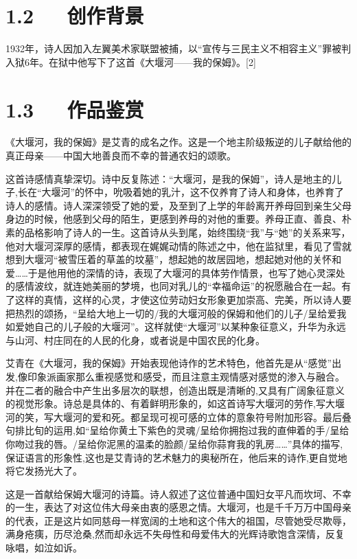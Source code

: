 \documentclass[letterpaper,10pt,english]{sphinxmanual}
\begin{document}
\section{1.2   创作背景}
\label{\detokenize{p01_u6563_u6587/_u827e_u9752-_u5927_u5830_u6cb3_u2014_u2014_u6211_u7684_u4fdd_u59c6:id4}}
1932年，诗人因加入左翼美术家联盟被捕，以“宣传与三民主义不相容主义”罪被判入狱6年。在狱中他写下了这首《大堰河——我的保姆》。{[}2{]}


\section{1.3   作品鉴赏}
\label{\detokenize{p01_u6563_u6587/_u827e_u9752-_u5927_u5830_u6cb3_u2014_u2014_u6211_u7684_u4fdd_u59c6:id5}}
《大堰河，我的保姆》是艾青的成名之作。这是一个地主阶级叛逆的儿子献给他的真正母亲——中国大地善良而不幸的普通农妇的颂歌。

这首诗感情真挚深切。诗中反复陈述：“大堰河，是我的保姆”，诗人是地主的儿子,长在“大堰河”的怀中，吮吸着她的乳汁，这不仅养育了诗人和身体，也养育了诗人的感情。诗人深深领受了她的爱，及至到了上学的年龄离开养母回到亲生父母身边的时候，他感到父母的陌生，更感到养母的对他的重要。养母正直、善良、朴素的品格影响了诗人的一生。这首诗从头到尾，始终围绕“我”与“她”的关系来写，他对大堰河深厚的感情，都表现在娓娓动情的陈述之中，他在监狱里，看见了雪就想到大堰河“被雪压着的草盖的坟墓”，想起她的故居园地，想起她对他的关怀和爱……于是他用他的深情的诗，表现了大堰河的具体劳作情景，也写了她心灵深处的感情波纹，就连她美丽的梦境，也同对乳儿的“幸福命运”的祝愿融合在一起。有了这样的真情，这样的心灵，才使这位劳动妇女形象更加崇高、完美，所以诗人要把热烈的颂扬，“呈给大地上一切的/我的大堰河般的保姆和他们的儿子/呈给爱我如爱她自己的儿子般的大堰河”。这样就使“大堰河”以某种象征意义，升华为永远与山河、村庄同在的人民的化身，或者说是中国农民的化身。

艾青在《大堰河，我的保姆》开始表现他诗作的艺术特色，他首先是从“感觉”出发,像印象派画家那么重视感觉和感受，而且注意主观情感对感觉的渗入与融合。并在二者的融合中产生出多层次的联想，创造出既是清晰的,又具有广阔象征意义的视觉形象。诗总是具体的、有着鲜明形象的，如这首诗写大堰河的劳作,写大堰河的笑，写大堰河的爱和死。都呈现可视可感的立体的意象符号附加形容。最后叠句排比旬的运用,如“呈给你黄土下紫色的灵魂/呈给你拥抱过我的直伸着的手/呈给你吻过我的唇。/呈给你泥黑的温柔的脸颜/呈给你蒜育我的乳房……”具体的描写,保证语言的形象性,这也是艾青诗的艺术魅力的奥秘所在，他后来的诗作,更自觉地将它发扬光大了。

这是一首献给保姆大堰河的诗篇。诗人叙述了这位普通中国妇女平凡而坎坷、不幸的一生，表达了对这位伟大母亲由衷的感恩之情。大堰河，也是千千万万中国母亲的代表，正是这片如同慈母一样宽阔的土地和这个伟大的祖国，尽管她受尽欺辱，满身疮痍，历尽沧桑,然而却永远不失母性和母爱伟大的光辉诗歌饱含深情，反复咏唱，如泣如诉。
\end{document}
